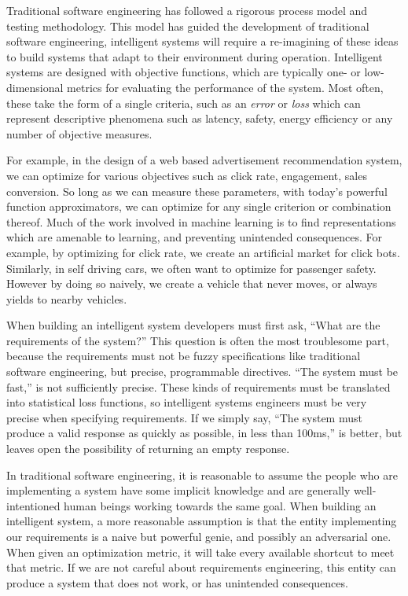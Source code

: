 \documentclass[12pt,initial,twoside,maitrise]{dms}
\numberwithin{equation}{section}
\numberwithin{table}{chapter}
\numberwithin{figure}{chapter}
\begin{document}
Traditional software engineering has followed a rigorous process model and testing methodology. This model has guided the development of traditional software engineering, intelligent systems will require a re-imagining of these ideas to build systems that adapt to their environment during operation. Intelligent systems are designed with objective functions, which are typically one- or low-dimensional metrics for evaluating the performance of the system. Most often, these take the form of a single criteria, such as an \textit{error} or \textit{loss} which can represent descriptive phenomena such as latency, safety, energy efficiency or any number of objective measures.

For example, in the design of a web based advertisement recommendation system, we can optimize for various objectives such as click rate, engagement, sales conversion. So long as we can measure these parameters, with today's powerful function approximators, we can optimize for any single criterion or combination thereof. Much of the work involved in machine learning is to find representations which are amenable to learning, and preventing unintended consequences. For example, by optimizing for click rate, we create an artificial market for click bots. Similarly, in self driving cars, we often want to optimize for passenger safety. However by doing so naively, we create a vehicle that never moves, or always yields to nearby vehicles.

When building an intelligent system developers must first ask, ``What are the requirements of the system?'' This question is often the most troublesome part, because the requirements must not be fuzzy specifications like traditional software engineering, but precise, programmable directives. ``The system must be fast,'' is not sufficiently precise. These kinds of requirements must be translated into statistical loss functions, so intelligent systems engineers must be very precise when specifying requirements. If we simply say, ``The system must produce a valid response as quickly as possible, in less than 100ms,'' is better, but leaves open the possibility of returning an empty response.

In traditional software engineering, it is reasonable to assume the people who are implementing a system have some implicit knowledge and are generally well-intentioned human beings working towards the same goal. When building an intelligent system, a more reasonable assumption is that the entity implementing our requirements is a naive but powerful genie, and possibly an adversarial one. When given an optimization metric, it will take every available shortcut to meet that metric. If we are not careful about requirements engineering, this entity can produce a system that does not work, or has unintended consequences.
\end{document}
